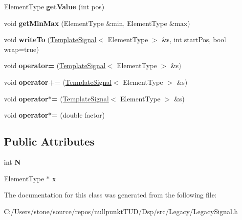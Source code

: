 \begin{DoxyCompactItemize}
Element\+Type {\bfseries get\+Value} (int pos)
\item 
\mbox{\label{class_template_signal_a24a13918aab8567d2c387a44f3cc766f}} 
void {\bfseries get\+Min\+Max} (Element\+Type \&min, Element\+Type \&max)
\item 
\mbox{\label{class_template_signal_aacf971fa468989158fdc2730dfb8db0f}} 
void {\bfseries write\+To} (\mbox{\hyperlink{class_template_signal}{Template\+Signal}}$<$ Element\+Type $>$ \&s, int start\+Pos, bool wrap=true)
\item 
\mbox{\label{class_template_signal_a6a533de0b8ddcd4442e51daf3838d1f9}} 
void {\bfseries operator=} (\mbox{\hyperlink{class_template_signal}{Template\+Signal}}$<$ Element\+Type $>$ \&s)
\item 
\mbox{\label{class_template_signal_a3ad7944c7b62ea70b4f00deba4cb4f9a}} 
void {\bfseries operator+=} (\mbox{\hyperlink{class_template_signal}{Template\+Signal}}$<$ Element\+Type $>$ \&s)
\item 
\mbox{\label{class_template_signal_a9608fb367fa0db37c84834ba8e4d1f5c}} 
void {\bfseries operator$\ast$=} (\mbox{\hyperlink{class_template_signal}{Template\+Signal}}$<$ Element\+Type $>$ \&s)
\item 
\mbox{\label{class_template_signal_a93425ddbd362c71bb9ce9f7d683463fc}} 
void {\bfseries operator$\ast$=} (double factor)
\end{DoxyCompactItemize}
\subsection*{Public Attributes}
\begin{DoxyCompactItemize}
\item 
\mbox{\label{class_template_signal_a8b36ba167c5889280bf261193cbe5272}} 
int {\bfseries N}
\item 
\mbox{\label{class_template_signal_a80ef9fd1a3ada320e3f692bd326f1490}} 
Element\+Type $\ast$ {\bfseries x}
\end{DoxyCompactItemize}


The documentation for this class was generated from the following file\+:\begin{DoxyCompactItemize}
\item 
C\+:/\+Users/stone/source/repos/nullpunkt\+T\+U\+D/\+Dsp/src/\+Legacy/Legacy\+Signal.\+h\end{DoxyCompactItemize}
